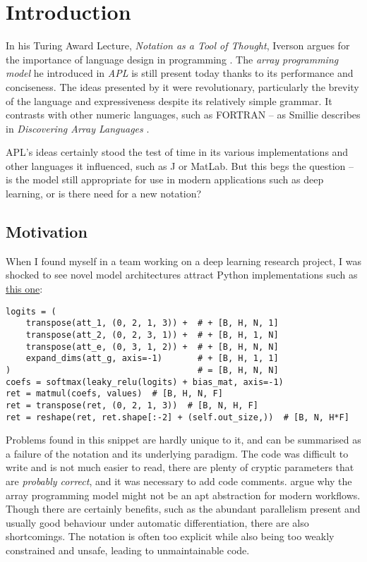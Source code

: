 \chapter{Introduction}

In his Turing Award Lecture, \textit{Notation as a Tool of Thought}, Iverson argues for the importance of language design in programming \cite{iverson2007notation}. The \textit{array programming model} he introduced in \textit{APL} is still present today thanks to its performance and conciseness. The ideas presented by it were revolutionary, particularly the brevity of the language and expressiveness despite its relatively simple grammar. It contrasts with other numeric languages, such as FORTRAN -- as Smillie describes in \textit{Discovering Array Languages} \cite{smillie2000lecture}. 

APL's ideas certainly stood the test of time in its various implementations and other languages it influenced, such as J or MatLab. But this begs the question -- is the model still appropriate for use in modern applications such as deep learning, or is there need for a new notation?

\section{Motivation}

When I found myself in a team working on a deep learning research project, I was shocked to see novel model architectures attract Python implementations such as \href{https://github.com/google-deepmind/clrs/blob/8697f51663bd77548f4b3108816c84d163883361/clrs/_src/processors.py#L140}{this one}:
\begin{center} \begin{minipage}{0.65\textwidth}
\begin{verbatim}
logits = (
    transpose(att_1, (0, 2, 1, 3)) +  # + [B, H, N, 1]
    transpose(att_2, (0, 2, 3, 1)) +  # + [B, H, 1, N]
    transpose(att_e, (0, 3, 1, 2)) +  # + [B, H, N, N]
    expand_dims(att_g, axis=-1)       # + [B, H, 1, 1]
)                                     # = [B, H, N, N]
coefs = softmax(leaky_relu(logits) + bias_mat, axis=-1)
ret = matmul(coefs, values)  # [B, H, N, F]
ret = transpose(ret, (0, 2, 1, 3))  # [B, N, H, F]
ret = reshape(ret, ret.shape[:-2] + (self.out_size,))  # [B, N, H*F]
\end{verbatim}
\end{minipage} \end{center}
Problems found in this snippet are hardly unique to it, and can be summarised as a failure of the notation and its underlying paradigm. The code was difficult to write and is not much easier to read, there are plenty of cryptic parameters that are \textit{probably correct}, and it was necessary to add code comments. \textcite{paszke2021getting} argue why the array programming model might not be an apt abstraction for modern workflows. Though there are certainly benefits, such as the abundant parallelism present and usually good behaviour under automatic differentiation, there are also shortcomings. The notation is often too explicit while also being too weakly constrained and unsafe, leading to unmaintainable code. 

